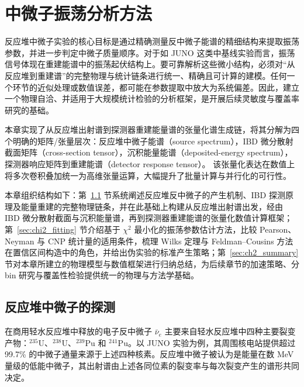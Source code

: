 \chapter{中微子振荡分析方法}
反应堆中微子实验的核心目标是通过精确测量反中微子能谱的精细结构来提取振荡参数，并进一步判定中微子质量顺序。对于如 JUNO 这类中基线实验而言，振荡信号体现在重建能谱中的振荡起伏结构上。要可靠解析这些微小结构，必须对“从反应堆到重建谱”的完整物理与统计链条进行统一、精确且可计算的建模。任何一个环节的近似处理或数值误差，都可能在参数提取中放大为系统偏差。因此，建立一个物理自洽、并适用于大规模统计检验的分析框架，是开展后续灵敏度与覆盖率研究的基础。

本章实现了从反应堆出射谱到探测器重建能量谱的张量化谱生成链，将其分解为四个明确的矩阵/张量层次：反应堆中微子能谱（source spectrum），IBD 微分散射截面矩阵（cross-section tensor），沉积能量能谱（deposited-energy spectrum），探测器响应矩阵到重建能谱（detector response tensor）。
该张量化表达在数值上将多次卷积叠加统一为高维张量运算，大幅提升了批量计算与并行化的可行性。

本章组织结构如下：第~\ref{sec:theory} 节系统阐述反应堆反中微子的产生机制、IBD 探测原理及能量重建的完整物理链条，并在此基础上构建从反应堆出射谱出发，经由 IBD 微分散射截面与沉积能量谱，再到探测器重建能谱的张量化数值计算框架；第~\ref{sec:chi2_fitting} 节介绍基于 $\chi^2$ 最小化的振荡参数估计方法，比较 Pearson、Neyman 与 CNP 统计量的适用条件，梳理 Wilks 定理与 Feldman--Cousins 方法在置信区间构造中的角色，并给出伪实验的标准产生策略；第~\ref{sec:ch2_summary} 节对本章所建立的物理模型与数值框架进行归纳总结，为后续章节的加速策略、分 bin 研究与覆盖性检验提供统一的物理与方法学基础。
\section{反应堆中微子的探测}
\label{sec:theory}
在商用轻水反应堆中释放的电子反中微子 $\bar{\nu}_e$ 主要来自轻水反应堆中四种主要裂变产物：$^{235}$U、$^{238}$U、$^{239}$Pu 和 $^{241}$Pu。以 JUNO 实验为例，其周围核电站提供超过 99.7\% 的中微子通量来源于上述四种核素。反应堆中微子被认为是能量在数 MeV 量级的低能中微子，其出射谱由上述各同位素的裂变率与每次裂变产生的谱形共同决定。

